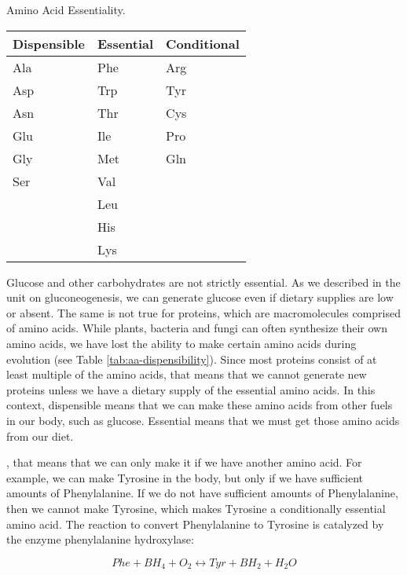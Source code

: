 \documentclass{tufte-handout}
\begin{document}
\begin{margintable}
\centering
\caption{Amino Acid Essentiality.}
\label{tab:aa-dispensibility}
\begin{tabular}{lll}
\hline
\textbf {Dispensible} & \textbf{Essential} & \textbf{Conditional}\\
\hline
Ala & Phe & Arg\\
Asp & Trp & Tyr\\
Asn & Thr & Cys\\
Glu & Ile & Pro\\
Gly & Met & Gln\\
Ser & Val\\
 & Leu\\
 & His\\
 & Lys\\
\hline
\end{tabular}
\end{margintable}

Glucose and other carbohydrates are not strictly essential.  As we described in the unit on gluconeogenesis, we can generate glucose even if dietary supplies are low or absent.  The same is not true for proteins, which are macromolecules comprised of amino acids.  While plants, bacteria and fungi can often synthesize their own amino acids, we have lost the ability to make certain amino acids during evolution (see Table \ref{tab:aa-dispensibility}).  Since most proteins consist of at least multiple of the amino acids, that means that we cannot generate new proteins unless we have a dietary supply of the essential amino acids.  In this context, dispensible means that we can make these amino acids from other fuels in our body, such as glucose.  Essential means that we must get those amino acids from our diet.  

, that means that we can only make it if we have another amino acid.   For example, we can make Tyrosine in the body, but only if we have sufficient amounts of Phenylalanine. If we do not have sufficient amounts of Phenylalanine, then we cannot make Tyrosine, which makes Tyrosine a conditionally essential amino acid. The reaction to convert Phenylalanine to Tyrosine is catalyzed by the enzyme phenylalanine hydroxylase:

\begin{equation}
Phe + BH_4 + O_2\leftrightarrow Tyr + BH_2 + H_2O 
\end{equation}
\end{document}
